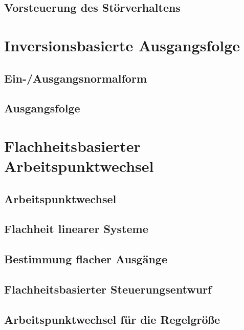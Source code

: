 \subsection{Vorsteuerung des Störverhaltens}

\section{Inversionsbasierte Ausgangsfolge}
\subsection{Ein-/Ausgangsnormalform}

\subsection{Ausgangsfolge}

\section{Flachheitsbasierter Arbeitspunktwechsel}
\subsection{Arbeitspunktwechsel}

\subsection{Flachheit linearer Systeme}

\subsection{Bestimmung flacher Ausgänge}

\subsection{Flachheitsbasierter Steuerungsentwurf}

\subsection{Arbeitspunktwechsel für die Regelgröße}
